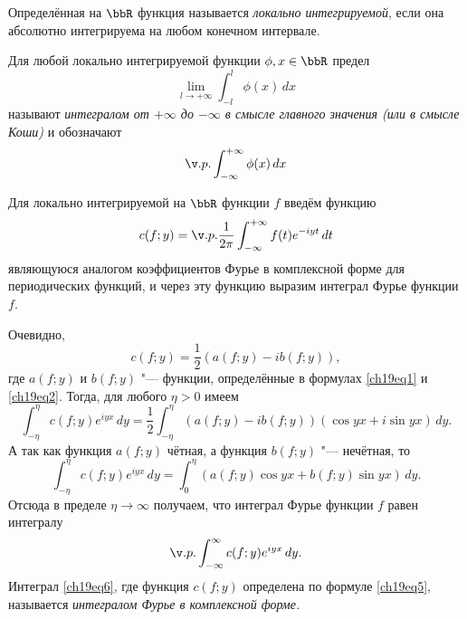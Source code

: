\begin{defn}
Определённая на $\bbR$ функция называется \textit{локально интегрируемой}, если она абсолютно интегрируема на любом конечном интервале.
\end{defn}
\begin{defn}
Для любой локально интегрируемой функции $\phi, x \in \bbR$ предел
$$
\lim_{l \to +\infty}\int_{-l}^{l} \phi(x)\,dx
$$
называют \textit{интегралом от $+\infty$ до $-\infty$ в смысле главного значения (или в смысле Коши)} и обозначают
$$
\v.p.\int_{-\infty}^{+\infty} \phi(x)\,dx
$$
\end{defn}

Для локально интегрируемой на $\bbR$ функции $f$ введём функцию
\begin{equation} \label{ch19eq5}
c(f;y)=\v.p.\frac{1}{2\pi}\int_{-\infty}^{+\infty} f(t)e^{-iyt}\,dt
\end{equation}
являющуюся аналогом коэффициентов Фурье в комплексной форме для периодических функций, и через эту функцию выразим интеграл Фурье функции $f$.

Очевидно,
$$
c(f;y) = \frac12 (a(f;y) - ib(f;y)),
$$
где $a(f;y)$ и $b(f;y)$ "--- функции, определённые в формулах \eqref{ch19eq1} и \eqref{ch19eq2}. Тогда, для любого $\eta > 0$ имеем
$$
\int_{-\eta}^{\eta} c(f;y)e^{iyx}\,dy = \frac12 \int_{-\eta}^{\eta} (a(f;y) - ib(f;y))(\cos yx + i\sin yx)\,dy.
$$
А так как функция $a(f;y)$ чётная, а функция $b(f;y)$ "--- нечётная, то
$$
\int_{-\eta}^{\eta} c(f;y)e^{iyx}\,dy = \int_{0}^{\eta}(a(f;y)\cos yx + b(f;y)\sin yx)\,dy.
$$
Отсюда в пределе $\eta \to \infty$ получаем, что интеграл Фурье функции $f$ равен интегралу
\begin{equation} \label{ch19eq6}
\v.p. \int_{-\infty}^{\infty} c(f;y)e^{iyx}\,dy.
\end{equation}
Интеграл \eqref{ch19eq6}, где функция $c(f;y)$ определена по формуле \eqref{ch19eq5}, называется \textit{интегралом Фурье в комплексной форме.}

